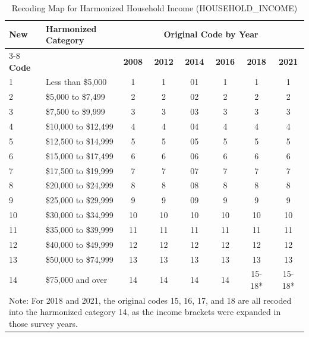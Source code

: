 \begin{table}
\centering
\small %
\caption{Recoding Map for Harmonized Household Income (HOUSEHOLD\_INCOME)}
\label{tab:income_recoding}
\begin{tabular}{llcccccc}
\toprule
\textbf{New} & \textbf{Harmonized Category} & \multicolumn{6}{c}{\textbf{Original Code by Year}} \\
\cmidrule(lr){3-8}
\textbf{Code} & & \textbf{2008} & \textbf{2012} & \textbf{2014} & \textbf{2016} & \textbf{2018} & \textbf{2021} \\
\midrule
1  & Less than \$5,000      & 1  & 1  & 01 & 1  & 1  & 1  \\
2  & \$5,000 to \$7,499       & 2  & 2  & 02 & 2  & 2  & 2  \\
3  & \$7,500 to \$9,999       & 3  & 3  & 03 & 3  & 3  & 3  \\
4  & \$10,000 to \$12,499     & 4  & 4  & 04 & 4  & 4  & 4  \\
5  & \$12,500 to \$14,999     & 5  & 5  & 05 & 5  & 5  & 5  \\
6  & \$15,000 to \$17,499     & 6  & 6  & 06 & 6  & 6  & 6  \\
7  & \$17,500 to \$19,999     & 7  & 7  & 07 & 7  & 7  & 7  \\
8  & \$20,000 to \$24,999     & 8  & 8  & 08 & 8  & 8  & 8  \\
9  & \$25,000 to \$29,999     & 9  & 9  & 09 & 9  & 9  & 9  \\
10 & \$30,000 to \$34,999     & 10 & 10 & 10 & 10 & 10 & 10 \\
11 & \$35,000 to \$39,999     & 11 & 11 & 11 & 11 & 11 & 11 \\
12 & \$40,000 to \$49,999     & 12 & 12 & 12 & 12 & 12 & 12 \\
13 & \$50,000 to \$74,999     & 13 & 13 & 13 & 13 & 13 & 13 \\
14 & \$75,000 and over      & 14 & 14 & 14 & 14 & 15-18* & 15-18* \\
\bottomrule
\multicolumn{8}{p{0.9\textwidth}}{\footnotesize *Note: For 2018 and 2021, the original codes 15, 16, 17, and 18 are all recoded into the harmonized category 14, as the income brackets were expanded in those survey years.} \\
\end{tabular}
\end{table}

